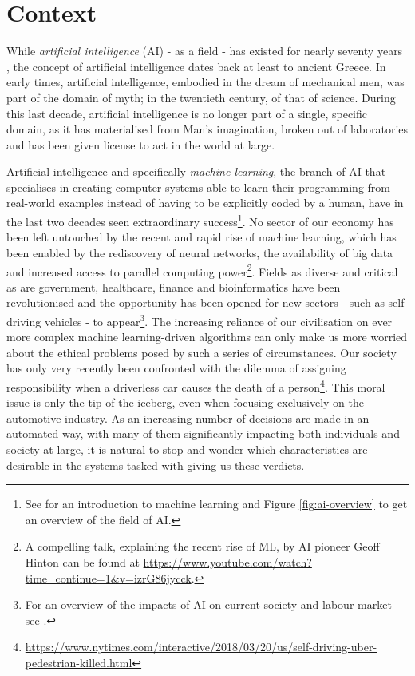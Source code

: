 \section{Context} \label{sec:intro-context}
While \textit{artificial intelligence} (AI) - as a field - has existed for nearly seventy years \citep{moor2006dartmouth}, the concept of artificial intelligence dates back at least to ancient Greece.  
In early times, artificial intelligence, embodied in the dream of mechanical men, was part of the domain of myth; in the twentieth century, of that of science.  
During this last decade, artificial intelligence is no longer part of a single, specific domain, as it has materialised from Man's imagination, broken out of laboratories and has been given license to act in the world at large.

Artificial intelligence and specifically \textit{machine learning}, the branch of AI that specialises in creating computer systems able to learn their programming from real-world examples instead of having to be explicitly coded by a human, have in the last two decades seen extraordinary success\footnote{See \citet{shalev2014understanding} for an introduction to machine learning and Figure \ref{fig:ai-overview} to get an overview of the field of AI.}.
No sector of our economy has been left untouched by the recent and rapid rise of machine learning, which has been enabled by the rediscovery of neural networks, the availability of big data and increased access to parallel computing power\footnote{A compelling talk, explaining the recent rise of ML, by AI pioneer Geoff Hinton can be found at \url{https://www.youtube.com/watch?time_continue=1&v=izrG86jycck}.}.
Fields as diverse and critical as are government, healthcare, finance and bioinformatics have been revolutionised and the opportunity has been opened for new sectors - such as self-driving vehicles - to appear\footnote{For an overview of the impacts of AI on current society and labour market see \citet{schwab2017fourth}.}.
The increasing reliance of our civilisation on ever more complex machine learning-driven algorithms can only make us more worried about the ethical problems posed by such a series of circumstances.  
Our society has only very recently been confronted with the dilemma of assigning responsibility when a driverless car causes the death of a person\footnote{\url{https://www.nytimes.com/interactive/2018/03/20/us/self-driving-uber-pedestrian-killed.html}}.
This moral issue is only the tip of the iceberg, even when focusing exclusively on the automotive industry.  
As an increasing number of decisions are made in an automated way, with many of them significantly impacting both individuals and society at large, it is natural to stop and wonder which characteristics are desirable in the systems tasked with giving us these verdicts.  

